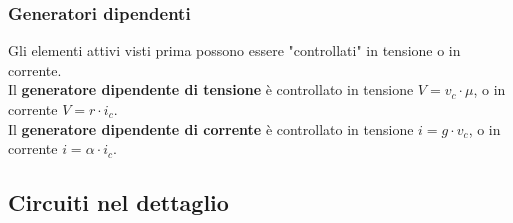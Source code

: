 \documentclass{article}
\begin{document}
\subsubsection{Generatori dipendenti}
Gli elementi attivi visti prima possono essere "controllati" in tensione o in corrente.
\vspace*{0.2cm}\\
Il \textbf{generatore dipendente di tensione} è controllato in tensione $V=v_c \cdot  \mu$, o in corrente $V = r \cdot i_c$.
\vspace*{0.2cm}\\
Il \textbf{generatore dipendente di corrente} è controllato in tensione $i = g \cdot v_c$, o in corrente $i = \alpha \cdot i_c$.



\subsection{Circuiti nel dettaglio}
\end{document}
